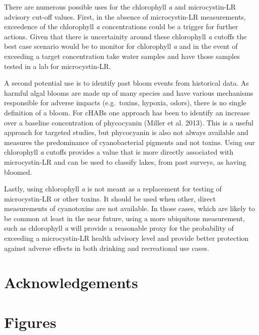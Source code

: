 \documentclass[11pt,]{article}
\begin{document}
There are numerous possible uses for the chlorophyll \emph{a} and
microcystin-LR advisory cut-off values. First, in the absence of
microcystin-LR measurements, exceedence of the chlorophyll \emph{a}
concentrations could be a trigger for further actions. Given that there
is uncertainity around these chlorophyll \emph{a} cutoffs the best case
scenario would be to monitor for chlorophyll \emph{a} and in the event
of exceeding a target concentration take water samples and have those
samples tested in a lab for microcystin-LR.

A second potential use is to identify past bloom events from historical
data. As harmful algal blooms are made up of many species and have
various mechanisms responsible for adverse impacts (e.g.~toxins,
hypoxia, odors), there is no single definition of a bloom. For cHABs one
approach has been to identify an increase over a baseline concentration
of phycocyanin (Miller et al. 2013). This is a useful approach for
targeted studies, but phycocyanin is also not always available and
measures the predominance of cyanobacterial pigments and not toxins.
Using our chlorophyll \emph{a} cutoffs provides a value that is more
directly associated with microcystin-LR and can be used to classify
lakes, from past surveys, as having bloomed.

Lastly, using chlorophyll \emph{a} is not meant as a replacement for
testing of microcystin-LR or other toxins. It should be used when other,
direct measurements of cyanotoxins are not available. In those cases,
which are likely to be common at least in the near future, using a more
ubiquitous measurement, such as chlorophyll \emph{a} will provide a
reasonable proxy for the probability of exceeding a microcystin-LR
health advisory level and provide better protection against adverse
effects in both drinking and recreational use cases.

\section{Acknowledgements}\label{acknowledgements}

\newpage

\section{Figures}\label{figures}
\end{document}
